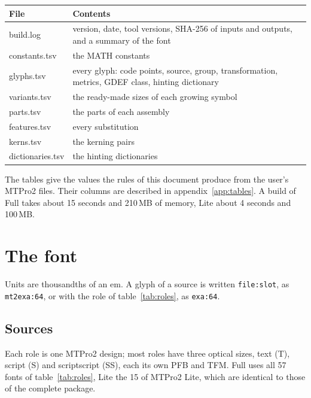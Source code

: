 \documentclass[10pt]{article}
\newcommand\slot[2]{\texttt{#1:#2}}
\begin{document}
\begin{center}
\begin{tabularx}{\textwidth}{>{\ttfamily}lX}
\toprule
\normalfont File & Contents \\
\midrule
build.log & version, date, tool versions, SHA-256 of inputs and
  outputs, and a summary of the font \\
constants.tsv & the MATH constants \\
glyphs.tsv & every glyph: code points, source, group, transformation,
  metrics, GDEF class, hinting dictionary \\
variants.tsv & the ready-made sizes of each growing symbol \\
parts.tsv & the parts of each assembly \\
features.tsv & every substitution \\
kerns.tsv & the kerning pairs \\
dictionaries.tsv & the hinting dictionaries \\
\bottomrule
\end{tabularx}
\end{center}

The tables give the values the rules of this document produce from the
user's MTPro2 files.  Their columns are described in
appendix~\ref{app:tables}.  A build of Full takes about 15 seconds and
210\,MB of memory, Lite about 4 seconds and 100\,MB.

\section{The font}\label{sec:font}

Units are thousandths of an em.  A glyph of a source is written
\slot{file}{slot}, as \slot{mt2exa}{64}, or with the role of
table~\ref{tab:roles}, as \slot{exa}{64}.

\subsection{Sources}

Each role is one MTPro2 design; most roles have three optical sizes,
text (T), script (S) and scriptscript (SS), each its own PFB and TFM.
Full uses all 57 fonts of table~\ref{tab:roles}, Lite the 15 of MTPro2
Lite, which are identical to those of the complete package.
\end{document}
